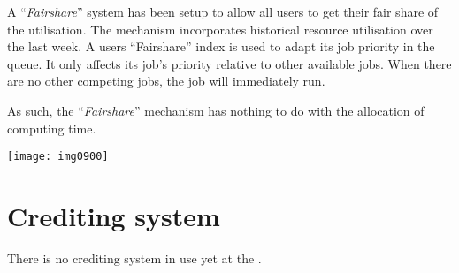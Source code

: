 A ``\emph{Fairshare}'' system has been setup to allow all users to get their
fair share of the \hpcname utilisation.  The mechanism incorporates historical
resource utilisation over the last week.  A users ``Fairshare'' index is used
to adapt its job priority in the queue.  It only affects its job's priority
relative to other available jobs. When there are no other competing jobs, the
job will immediately run.

As such, the ``\emph{Fairshare}'' mechanism has nothing to do with the
allocation of computing time.

\texttt{[image: img0900]}

\section{Crediting system}

There is no crediting system in use yet at the \hpc.
